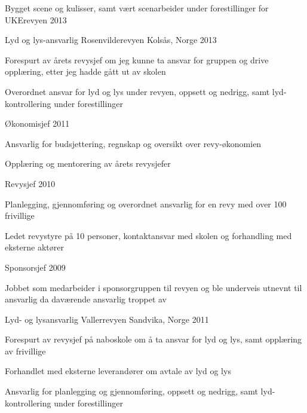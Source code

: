 \begin{cventries}
{\begin{cvitems}
        \item {Bygget scene og kulisser, samt vært scenarbeider under forestillinger for UKErevyen 2013}
      \end{cvitems}
    }
    \cventry
    {Lyd og lys-ansvarlig}
    {Rosenvilderevyen}
    {Kolsås, Norge}
    {2013}
    {
      \begin{cvitems}
        \item {Forespurt av årets revysjef om jeg kunne ta ansvar for gruppen og drive opplæring, etter jeg hadde gått ut av skolen}
        \item {Overordnet ansvar for lyd og lys under revyen, oppsett og nedrigg, samt lyd-kontrollering under forestillinger}
      \end{cvitems}
    }
    \cventry
    {Økonomisjef}
    {}
    {}
    {2011}
    {
      \begin{cvitems}
        \item {Ansvarlig for budsjettering, regnskap og oversikt over revy-økonomien}
        \item {Opplæring og mentorering av årets revysjefer}
      \end{cvitems}
    }
    \cventry
    {Revysjef}
    {}
    {}
    {2010}
    {
      \begin{cvitems}
        \item {Planlegging, gjennomføring og overordnet ansvarlig for en revy med over 100 frivillige}
        \item {Ledet revystyre på 10 personer, kontaktansvar med skolen og forhandling med eksterne aktører}
      \end{cvitems}
    }
    \cventry
    {Sponsorsjef}
    {}
    {}
    {2009}
    {
      \begin{cvitems}
        \item {Jobbet som medarbeider i sponsorgruppen til revyen og ble underveis utnevnt til ansvarlig da daværende ansvarlig troppet av}
      \end{cvitems}
    }
    
    \cventry
    {Lyd- og lysansvarlig}
    {Vallerrevyen}
    {Sandvika, Norge}
    {2011}
    {
      \begin{cvitems}
        \item {Forespurt av revysjef på naboskole om å ta ansvar for lyd og lys, samt opplæring av frivillige}
        \item {Forhandlet med eksterne leverandører om avtale av lyd og lys}
        \item {Ansvarlig for planlegging og gjennomføring, oppsett og nedrigg, samt lyd-kontrollering under forestillinger}
      \end{cvitems}
    }
    

\end{cventries}

